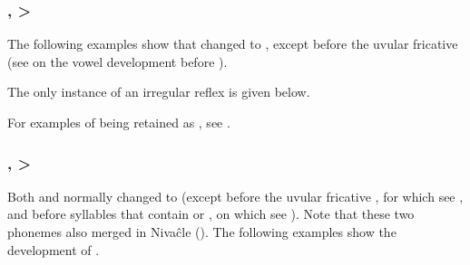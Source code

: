 \subsubsection{,  > } \label{mk-e-i}

The following examples show that  changed to , except before the uvular fricative  (see  on the vowel development before ).

\begin{exe}
    \ex \daughter
    \ex \thorne
    \ex \namen
    \ex \distal
    \ex \bite
    \ex \mortar
    \ex \rootn
    \ex \welln
    \ex \sendv
    \ex \feminine
    \ex \earkfe
    \ex \arrowkaxe
    \ex \pacu
    \ex \chaniart
    \ex \offspring
    \ex \wash
    \ex \squash
    \ex \firewoodlhet
    \ex \heartmn
    \ex \otter
    \ex \cavy
    \ex \hear
    \ex \rain
    \ex \beard
    \ex \spank
    \ex \whitequebracho
    \ex \eyelash
    \ex \eyebrow
    \ex \tears
    \ex \saymn
    \ex \rheum
    \ex \ashamedmn
    \ex \cloudmn
    \ex \walk
    \ex \onemn
    \ex \dirt
    \ex \orphanmn
    \ex \teach
\end{exe}

The only instance of an irregular reflex is given below.

\begin{exe}
    \ex \bat \label{mk-e-bat}
\end{exe}

For examples of  being retained as , see .

\subsubsection{,  > } \label{mk-a-ae}

Both  and  normally changed to  (except before the uvular fricative , for which see , and before syllables that contain  or , on which see ). Note that these two phonemes also merged in Nivaĉle (). The following examples show the development of .

\begin{exe}
    \ex \plaj
    \ex \mouth
    \ex \fruit
    \ex \bite
    \ex \companion
    \ex \rightn
    \ex \disease
    \ex \firef
    \ex \cutdown
    \ex \dew
    \ex \grove
    \ex \redquebracho
    \ex \neighbor
    \ex \pacu
    \ex \smooth
    \ex \louse
    \ex \interr
    \ex {}
    \ex \nose
    \ex \dayworld
    \ex \rain
    \ex \inorderto
    \ex \fishwithhook
    \ex \vertical
    \ex \thunder
    \ex \tsofatajt
    \ex \guayacan
    \ex \tuscaf
    \ex \tuscat
    \ex \tuscag
    \ex \woman
    \ex \maguari
    \ex \wildbean
    \ex \meat
    \ex \mosquito
    \ex \teach
    \ex \lessergrison
\end{exe}

